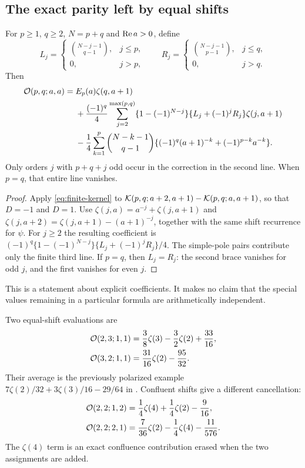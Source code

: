 \subsection{The exact parity left by equal shifts}

\begin{theorem}\label{thm:parity}
For $p\ge1$, $q\ge2$, $N=p+q$ and $\operatorname{Re} a>0$, define
\[
 L_j=\begin{cases}\binom{N-j-1}{q-1},&j\le p,\\0,&j>p,\end{cases}
 \qquad
 R_j=\begin{cases}\binom{N-j-1}{p-1},&j\le q,\\0,&j>q.\end{cases}
\]
Then
\begin{align}
 \mathcal O(p,q;a,a)={}&E_p(a)\zeta(q,a+1)\notag\\
 &+\frac{(-1)^q}{4}\sum_{j=2}^{\max(p,q)}
 \{1-(-1)^{N-j}\}\{L_j+(-1)^jR_j\}\zeta(j,a+1)\notag\\
 &-\frac14\sum_{k=1}^{p}\binom{N-k-1}{q-1}
 \{(-1)^q(a+1)^{-k}+(-1)^{p-k}a^{-k}\}.
 \label{eq:ordered-parity}
\end{align}
Only orders $j$ with $p+q+j$ odd occur in the correction in the second
line. When $p=q$, that entire line vanishes.
\end{theorem}

\begin{proof}
Apply \eqref{eq:finite-kernel} to
$\mathcal K(p,q;a+2,a+1)-\mathcal K(p,q;a,a+1)$, so that $D=-1$ and $D=1$.
Use $\zeta(j,a)=a^{-j}+\zeta(j,a+1)$ and
$\zeta(j,a+2)=\zeta(j,a+1)-(a+1)^{-j}$, together with the same
shift recurrence for $\psi$. For $j\ge2$ the resulting coefficient is
$(-1)^q\{1-(-1)^{N-j}\}\{L_j+(-1)^jR_j\}/4$.
The simple-pole pairs contribute only the finite third line.
If $p=q$, then $L_j=R_j$: the second brace vanishes for odd $j$,
and the first vanishes for even $j$.
\end{proof}

This is a statement about explicit coefficients. It makes no claim
that the special values remaining in a particular formula are
arithmetically independent.

\begin{example}\label{ex:ordered-values}
Two equal-shift evaluations are
\begin{align}
 \mathcal O(2,3;1,1)&=\frac38\zeta(3)-\frac32\zeta(2)+\frac{33}{16},
 \label{eq:example-23}\\
 \mathcal O(3,2;1,1)&=\frac{31}{16}\zeta(2)-\frac{95}{32}.
 \label{eq:example-32}
\end{align}
Their average is the previously polarized example
$7\zeta(2)/32+3\zeta(3)/16-29/64$ in \cite{repo:finite}.
Confluent shifts give a different cancellation:
\begin{align}
 \mathcal O(2,2;1,2)&=\frac14\zeta(4)+\frac14\zeta(2)-\frac9{16},
 \label{eq:example-1122}\\
 \mathcal O(2,2;2,1)&=\frac7{36}\zeta(2)-\frac14\zeta(4)-\frac{11}{576}.
 \label{eq:example-2211}
\end{align}
The $\zeta(4)$ term is an exact confluence contribution erased when
the two assignments are added.
\end{example}

